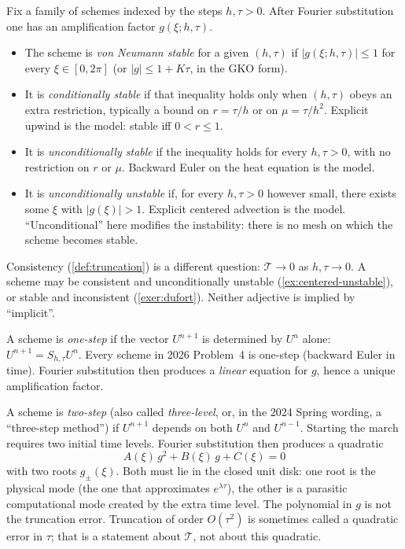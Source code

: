 \documentclass[11pt,a4paper]{article}
\begin{document}
\begin{definition}
\label{def:cond-uncond}
Fix a family of schemes indexed by the steps \(h,\tau>0\). After Fourier substitution one has an amplification factor \(g(\xi;h,\tau)\).
\begin{itemize}
    \item The scheme is \emph{von Neumann stable} for a given \((h,\tau)\) if \(\lvert g(\xi;h,\tau)\rvert\le 1\) for every \(\xi\in[0,2\pi]\) (or \(\lvert g\rvert\le 1+K\tau\), in the GKO form).
    \item It is \emph{conditionally stable} if that inequality holds only when \((h,\tau)\) obeys an extra restriction, typically a bound on \(r=\tau/h\) or on \(\mu=\tau/h^2\). Explicit upwind is the model: stable iff \(0<r\le 1\).
    \item It is \emph{unconditionally stable} if the inequality holds for every \(h,\tau>0\), with no restriction on \(r\) or \(\mu\). Backward Euler on the heat equation is the model.
    \item It is \emph{unconditionally unstable} if, for every \(h,\tau>0\) however small, there exists some \(\xi\) with \(\lvert g(\xi)\rvert>1\). Explicit centered advection is the model. ``Unconditional'' here modifies the instability: there is no mesh on which the scheme becomes stable.
\end{itemize}
Consistency (\cref{def:truncation}) is a different question: \(\mathcal T\to 0\) as \(h,\tau\to 0\). A scheme may be consistent and unconditionally unstable (\cref{ex:centered-unstable}), or stable and inconsistent (\cref{exer:dufort}). Neither adjective is implied by ``implicit''.
\end{definition}

\begin{definition}
\label{def:one-two-step}
A scheme is \emph{one-step} if the vector \(U^{n+1}\) is determined by \(U^n\) alone: \(U^{n+1}=S_{h,\tau}U^n\). Every scheme in 2026 Problem~4 is one-step (backward Euler in time). Fourier substitution then produces a \emph{linear} equation for \(g\), hence a unique amplification factor.

A scheme is \emph{two-step} (also called \emph{three-level}, or, in the 2024 Spring wording, a ``three-step method'') if \(U^{n+1}\) depends on both \(U^n\) and \(U^{n-1}\). Starting the march requires two initial time levels. Fourier substitution then produces a quadratic
\[
A(\xi)\,g^2+B(\xi)\,g+C(\xi)=0
\]
with two roots \(g_\pm(\xi)\). Both must lie in the closed unit disk: one root is the physical mode (the one that approximates \(e^{\lambda\tau}\)), the other is a parasitic computational mode created by the extra time level. The polynomial in \(g\) is not the truncation error. Truncation of order \(O(\tau^2)\) is sometimes called a quadratic error in \(\tau\); that is a statement about \(\mathcal T\), not about this quadratic.
\end{definition}
\end{document}
